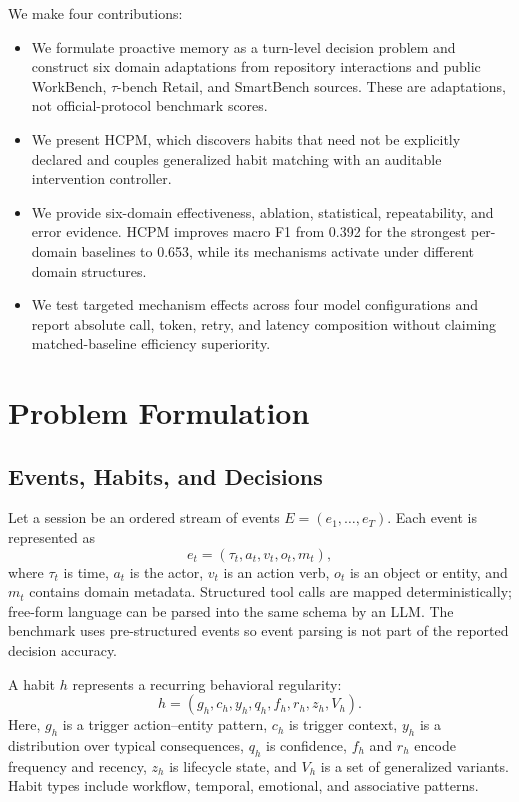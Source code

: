 \documentclass[sigconf,anonymous,review]{acmart}
\newcommand{\system}{HCPM}
\begin{document}
We make four contributions:
\begin{itemize}
    \item We formulate proactive memory as a turn-level decision problem and construct six domain adaptations from repository interactions and public WorkBench, $\tau$-bench Retail, and SmartBench sources. These are adaptations, not official-protocol benchmark scores.
    \item We present \system{}, which discovers habits that need not be explicitly declared and couples generalized habit matching with an auditable intervention controller.
    \item We provide six-domain effectiveness, ablation, statistical, repeatability, and error evidence. \system{} improves macro F1 from 0.392 for the strongest per-domain baselines to 0.653, while its mechanisms activate under different domain structures.
    \item We test targeted mechanism effects across four model configurations and report absolute call, token, retry, and latency composition without claiming matched-baseline efficiency superiority.
\end{itemize}

\section{Problem Formulation}

\subsection{Events, Habits, and Decisions}

Let a session be an ordered stream of events $E=(e_1,\ldots,e_T)$.
Each event is represented as
\begin{equation}
e_t=(\tau_t,a_t,v_t,o_t,m_t),
\end{equation}
where $\tau_t$ is time, $a_t$ is the actor, $v_t$ is an action verb, $o_t$ is an object or entity, and $m_t$ contains domain metadata.
Structured tool calls are mapped deterministically; free-form language can be parsed into the same schema by an LLM.
The benchmark uses pre-structured events so event parsing is not part of the reported decision accuracy.

A habit $h$ represents a recurring behavioral regularity:
\begin{equation}
h=(g_h,c_h,y_h,q_h,f_h,r_h,z_h,V_h).
\end{equation}
Here, $g_h$ is a trigger action--entity pattern, $c_h$ is trigger context, $y_h$ is a distribution over typical consequences, $q_h$ is confidence, $f_h$ and $r_h$ encode frequency and recency, $z_h$ is lifecycle state, and $V_h$ is a set of generalized variants.
Habit types include workflow, temporal, emotional, and associative patterns.
\end{document}
